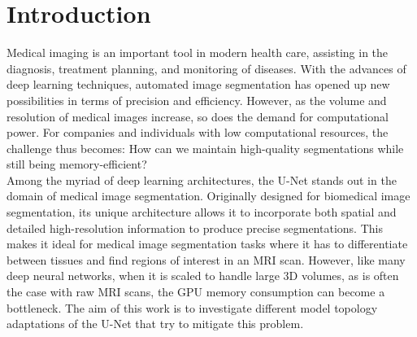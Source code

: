 \chapter{Introduction}
\noindent Medical imaging is an important tool in modern health care, assisting in the diagnosis, treatment planning, and monitoring of diseases.
With the advances of deep learning techniques, automated image segmentation has opened up new possibilities in terms of precision and efficiency\cite[1-2]{zhou_review_2021}.
However, as the volume and resolution of medical images increase, so does the demand for computational power\cite[1]{wang_super-resolution_2023}.
For companies and individuals with low computational resources, the challenge thus becomes: How can we maintain high-quality segmentations while still being memory-efficient?\\[1ex]
Among the myriad of deep learning architectures, the U-Net stands out in the domain of medical image segmentation.
Originally designed for biomedical image segmentation, its unique architecture allows it to incorporate both spatial and detailed high-resolution information to produce precise segmentations\cite{ronneberger_u-net_2015}.
This makes it ideal for medical image segmentation tasks where it has to differentiate between tissues and find regions of interest in an MRI scan.
However, like many deep neural networks, when it is scaled to handle large $3$D volumes, as is often the case with raw MRI scans, the GPU memory consumption can become a bottleneck.
The aim of this work is to investigate different model topology adaptations of the U-Net that try to mitigate this problem.

